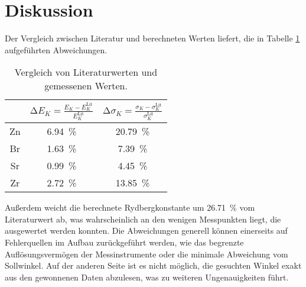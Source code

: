 \section{Diskussion}
\label{sec:Diskussion}

Der Vergleich zwischen Literatur und berechneten Werten liefert, die in Tabelle \ref{tab:abw} aufgeführten Abweichungen.
\begin{table}
  \centering
  \caption{Vergleich von Literaturwerten und gemessenen Werten.}
  \label{tab:abw}
  \begin{tabular}{c c c}
    \toprule
    & $\increment E_K = \frac{E_K - E^\text{Lit}_K}{E^\text{Lit}_K}$ & $\increment \sigma_K = \frac{\sigma_K - \sigma^\text{Lit}_K}{\sigma^\text{Lit}_K}$ \\
    \midrule
    Zn & \SI{6.94}{\percent} & \SI{20.79}{\percent} \\
    Br & \SI{1.63}{\percent} & \SI{7.39}{\percent} \\
    Sr & \SI{0.99}{\percent} & \SI{4.45}{\percent} \\
    Zr & \SI{2.72}{\percent} & \SI{13.85}{\percent} \\
    \bottomrule
  \end{tabular}
\end{table}
Außerdem weicht die berechnete Rydbergkonstante um \SI{26.71}{\percent} vom Literaturwert ab,
was wahrscheinlich an den wenigen Messpunkten liegt, die ausgewertet werden konnten.
Die Abweichungen generell können einerseits auf Fehlerquellen im Aufbau zurückgeführt werden,
wie das begrenzte Auflösungsvermögen der Messinstrumente oder die minimale Abweichung vom Sollwinkel.
Auf der anderen Seite ist es nicht möglich, die gesuchten Winkel exakt aus den gewonnenen Daten abzulesen,
was zu weiteren Ungenauigkeiten führt.
